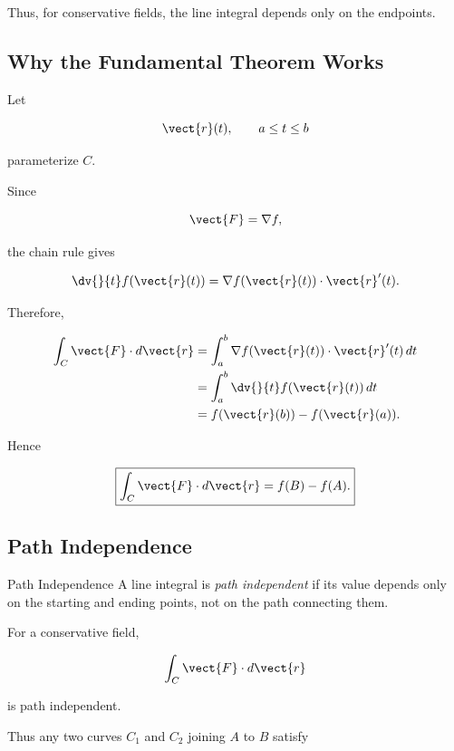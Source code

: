 Thus, for conservative fields, the line integral depends only on the
endpoints.

\subsection{Why the Fundamental Theorem Works}
\label{subsec:proof-ftli}

Let

\[ \vect{r}(t),\qquad a\leq t\leq b \]

parameterize \(C\).

Since

\[ \vect{F}=\nabla f, \]

the chain rule gives

\[ \dv{}{t}f(\vect{r}(t))
=\nabla f(\vect{r}(t))\cdot\vect{r}'(t). \]

Therefore,

\[
\begin{aligned}
\int_C\vect{F}\cdot d\vect{r}
&=\int_a^b\nabla f(\vect{r}(t))\cdot\vect{r}'(t)\,dt\\
&=\int_a^b\dv{}{t}f(\vect{r}(t))\,dt\\
&=f(\vect{r}(b))-f(\vect{r}(a)).
\end{aligned}
\]

Hence

\[ \boxed{\int_C\vect{F}\cdot d\vect{r}=f(B)-f(A).} \]

\subsection{Path Independence}
\label{subsec:path-independence}

\begin{definitionbox}{Path Independence}
A line integral is \emph{path independent} if its value depends only on the
starting and ending points, not on the path connecting them.
\end{definitionbox}

For a conservative field,

\[ \int_C\vect{F}\cdot d\vect{r} \]

is path independent.

Thus any two curves \(C_1\) and \(C_2\) joining \(A\) to \(B\) satisfy

